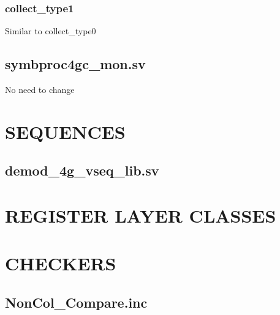 \documentclass{note}
\begin{document}
\subsubsection{collect\_type1}
\bit
\w Similar to collect\_type0
\eit

\subsection{symbproc4gc\_mon.sv}
\bit
\w No need to change
\eit



\section{SEQUENCES}
\subsection{demod\_4g\_vseq\_lib.sv}
%



\section{REGISTER LAYER CLASSES}


\section{CHECKERS}
\subsection{NonCol\_Compare.inc}
\end{document}
